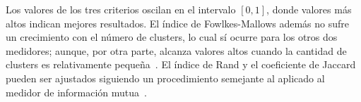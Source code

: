 Los valores de los tres criterios oscilan en el intervalo $[0,1]$, donde valores más altos indican mejores resultados.
El índice de Fowlkes-Mallows además no sufre un crecimiento con el número de clusters, lo cual sí ocurre para los otros dos medidores;
aunque, por otra parte, alcanza valores altos cuando la cantidad de clusters es relativamente pequeña~\cite{Wagner07}.
El índice de Rand y el coeficiente de Jaccard pueden ser ajustados siguiendo un procedimiento semejante al aplicado al medidor de información mutua~\cite{Vinh10, Wagner07}.

